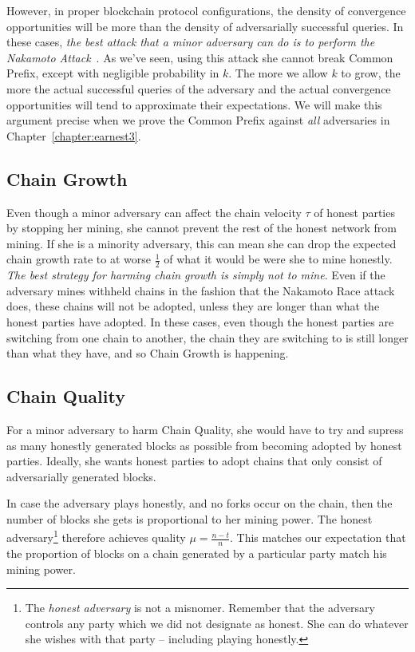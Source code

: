 However, in proper blockchain protocol configurations, the density of convergence
opportunities will be more than the density of adversarially successful queries.
In these cases, \emph{the best attack that a minor adversary can do is to perform the
Nakamoto Attack}~\cite{nakamoto-wins}. As we've seen, using this attack she cannot break Common Prefix,
except with negligible probability in $k$. The more we allow $k$ to grow, the more the actual successful
queries of the adversary and the actual convergence opportunities will tend to
approximate their expectations. We will make this argument precise when we
prove the Common Prefix against \emph{all} adversaries in Chapter~\ref{chapter:earnest3}.

\subsection*{Chain Growth}
Even though a minor adversary can affect the chain velocity $\tau$ of honest
parties by stopping her mining, she cannot prevent the rest of the honest network
from mining. If she is a minority adversary, this can mean she can drop the expected
chain growth rate to at worse $\frac{1}{2}$ of what it would be were she to mine honestly.
\emph{The best strategy for harming chain growth is simply not to mine}.
Even if the adversary mines withheld chains in the fashion that the Nakamoto Race
attack does, these chains will not be adopted, unless they are longer than what
the honest parties have adopted. In these cases, even though the honest parties are
switching from one chain to another, the chain they are switching to is still longer
than what they have, and so Chain Growth is happening.

\subsection*{Chain Quality}
For a minor adversary to harm Chain Quality, she would have to try and supress as many
honestly generated blocks as possible from becoming adopted by honest parties. Ideally,
she wants honest parties to adopt chains that only consist of adversarially generated blocks.

In case the adversary plays honestly, and no forks occur on the chain, then the number of
blocks she gets is proportional to her mining power. The honest adversary\footnote{The
\emph{honest adversary} is not a misnomer. Remember that the adversary controls any party which
we did not designate as honest. She can do whatever she wishes with that party -- including
playing honestly.}
therefore achieves quality $\mu = \frac{n - t}{n}$. This matches our expectation that
the proportion of blocks on a chain generated by a particular party match his mining power.

